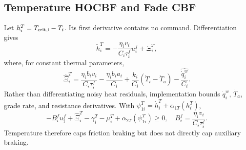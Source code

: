 \subsection{Temperature HOCBF and Fade CBF}
Let $h_i^T=T_{\rm crit,i}-T_i$. Its first derivative contains no command. Differentiation gives
\begin{equation}
\ddot h_i^T=-\frac{\eta_iv_i}{C_i\tau_i^f}u_i^f+\Xi_i^T,
\end{equation}
where, for constant thermal parameters,
\begin{equation}
\widehat\Xi_i^T=\frac{\eta_ib_iv_i}{C_i\tau_i^f}-\frac{\eta_ib_ia_i}{C_i}
+\frac{k_i}{C_i}(\dot T_i-\dot T_a)-\frac{\widehat{\dot q_i^w}}{C_i}.
\end{equation}
Rather than differentiating noisy heat residuals, implementation bounds $\dot q_i^w$, $\dot T_a$, grade rate, and resistance derivatives. With $\psi_{1i}^T=\dot h_i^T+\alpha_{1T}(h_i^T)$,
\begin{equation}\label{eq:thermal_hocbf}
-B_i^fu_i^f+\widehat\Xi_i^T-\gamma_i^T-\mu_i^T
+\alpha_{2T}(\psi_{1i}^T)\ge0,
\quad B_i^f=\frac{\eta_iv_i}{C_i\tau_i^f}.
\end{equation}
Temperature therefore caps friction braking but does not directly cap auxiliary braking.

